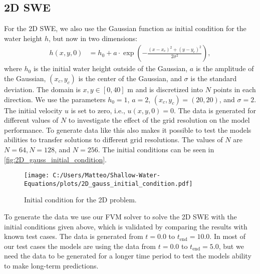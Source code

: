 \subsection*{2D SWE}
For the 2D SWE, we also use the Gaussian function as initial condition for the water height $h$, but now in two dimensions:
\begin{align*}
    h(x,y,0) &= h_0 + a \cdot \exp \left( -\frac{{(x-x_c)}^2 + {(y-y_c)}^2}{2\sigma^2} \right), 
\end{align*}
where $h_0$ is the initial water height outside of the Gaussian, $a$ is the amplitude of the Gaussian, $(x_c, y_c)$ is the center of the Gaussian, and $\sigma$ is the standard deviation.
The domain is $x,y \in [0,40]$ m and is discretized into $N$ points in each direction.
We use the parameters $h_0 = 1$, $a = 2$, $(x_c, y_c) = (20, 20)$, and $\sigma = 2$.
The initial velocity $u$ is set to zero, i.e., $u(x,y,0) = 0$.
The data is generated for different values of $N$ to investigate the effect of the grid resolution on the model performance.
To generate data like this also makes it possible to test the models abilities to transfer solutions to different grid resolutions.
The values of $N$ are $N = 64, N = 128$, and $N = 256$.
The initial conditions can be seen in \autoref{fig:2D_gauss_initial_condition}.
\begin{figure}[H]
    \centering
    \texttt{[image: C:/Users/Matteo/Shallow-Water-Equations/plots/2D\_gauss\_initial\_condition.pdf]}
    \caption{Initial condition for the 2D problem.}\label{fig:2D_gauss_initial_condition}
\end{figure}
To generate the data we use our FVM solver to solve the 2D SWE with the initial conditions given above, which is validated by comparing the results with known test cases.
The data is generated from $t = 0.0$ to $t_{\text{end}} = 10.0$.
In most of our test cases the models are using the data from $t = 0.0$ to $t_{\text{end}} = 5.0$, but we need the data to be generated for a longer time period to test the models ability to make long-term predictions.

